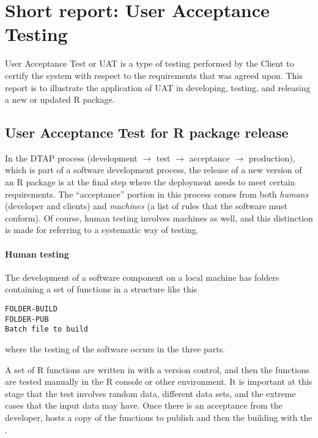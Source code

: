 \documentclass[oneside,a4paper]{memoir} %
\begin{document}
\chapter{Short report: User Acceptance Testing}

User Acceptance Test or \gls{UAT} is a type of testing performed by the Client to certify the system with respect to the requirements that was agreed upon. 
This report is to illustrate the application of \gls{UAT} in developing, testing, and releasing a new or updated \textsf{R} package.

\section{User Acceptance Test for R package release}
In the DTAP process (development $\to$ test $\to$ acceptance $\to$ production), which is part of a software development process, the release of a new version of an \textsf{R} package is at the final step where the deployment needs to meet certain requirements. The \enquote{acceptance} portion in this process comes from both \emph{humans} (developer and clients) and \emph{machines} (a list of rules that the software must conform). Of course, human testing involves machines as well, and this distinction is made for referring to a systematic way of testing. 


\subsubsection{Human testing}
The development of a software component on a local machine has folders containing a set of functions in a structure like this

\begin{verbatim}
FOLDER-BUILD
FOLDER-PUB
Batch file to build
\end{verbatim}
where the testing of the software occurs in the three parts. 

\bigbreak
\noindent
A set of \textsf{R} functions are written in  with a version control, and then the functions are tested manually in the \textsf{R} console or other environment. It is important at this stage that the test involves random data, different data sets, and the extreme cases that the input data may have. Once there is an acceptance from the developer,  hosts a copy of the functions to publish and then the building with the .
\end{document}

